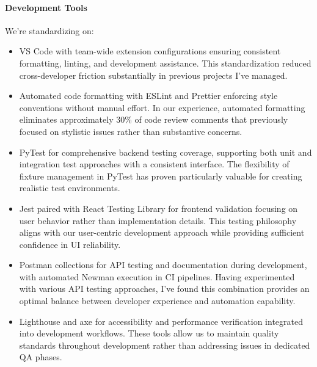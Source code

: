 \documentclass[12pt,a4paper]{article}
\begin{document}
\paragraph{Development Tools}
We're standardizing on:
\begin{itemize}
    \item VS Code with team-wide extension configurations ensuring consistent formatting, linting, and development assistance. This standardization reduced cross-developer friction substantially in previous projects I've managed.
    \item Automated code formatting with ESLint and Prettier enforcing style conventions without manual effort. In our experience, automated formatting eliminates approximately 30\% of code review comments that previously focused on stylistic issues rather than substantive concerns.
    \item PyTest for comprehensive backend testing coverage, supporting both unit and integration test approaches with a consistent interface. The flexibility of fixture management in PyTest has proven particularly valuable for creating realistic test environments.
    \item Jest paired with React Testing Library for frontend validation focusing on user behavior rather than implementation details. This testing philosophy aligns with our user-centric development approach while providing sufficient confidence in UI reliability.
    \item Postman collections for API testing and documentation during development, with automated Newman execution in CI pipelines. Having experimented with various API testing approaches, I've found this combination provides an optimal balance between developer experience and automation capability.
    \item Lighthouse and axe for accessibility and performance verification integrated into development workflows. These tools allow us to maintain quality standards throughout development rather than addressing issues in dedicated QA phases.
\end{itemize}
\end{document}

